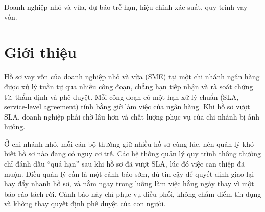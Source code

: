 \documentclass[journal]{IEEEtran}
\begin{document}
\begin{abstract}
Hồ sơ vay của doanh nghiệp nhỏ và vừa đi qua nhiều công đoạn, mỗi công đoạn có một hạn xử lý chuẩn tính bằng giờ làm việc. Các hệ thống thông thường chỉ báo hồ sơ quá hạn sau khi đã trễ. Bài báo trình bày hệ thống quản lý quy trình vay tích hợp bộ dự báo nguy cơ trễ dưới dạng một dịch vụ riêng. Hai mô hình, mỗi công đoạn một mô hình, ước lượng xác suất hồ sơ đang mở sẽ vượt hạn xử lý. Hạn xử lý là đầu vào của mô hình nên đổi định mức không cần huấn luyện lại; xác suất được hiệu chỉnh bằng hồi quy đẳng điệu và mỗi cảnh báo kèm tối đa ba lý do. Mô hình huấn luyện trên 20\,000 hồ sơ mô phỏng theo một nhật ký xử lý hồ sơ vay công khai. Trên tập kiểm tra, diện tích dưới đường cong đặc trưng hoạt động của bộ thu nhận đạt 0,824 ở tiếp nhận (trung bình năm lần chia dữ liệu là 0,813) và 0,720 ở thẩm định, so với 0,797 và 0,687 của đường cơ sở chỉ biết đồng hồ hạn xử lý. Mức cải thiện có ý nghĩa thống kê ở thẩm định nhưng chưa đủ bằng chứng ở tiếp nhận, nơi chỉ có 38 hồ sơ trễ. Mô hình huấn luyện ở một hạn cố định mất độ chính xác xác suất khi đổi hạn, còn mô hình nhận hạn làm đầu vào thì không. Chạy lại thực nghiệm trên một môi trường khác cho kết quả trùng khớp. Do dữ liệu mô phỏng, kết quả chỉ phản ánh phương pháp.
\end{abstract}

\begin{IEEEkeywords}
Doanh nghiệp nhỏ và vừa, dự báo trễ hạn, hiệu chỉnh xác suất, quy trình vay vốn.
\end{IEEEkeywords}

\section{Giới thiệu}
Hồ sơ vay vốn của doanh nghiệp nhỏ và vừa (SME) tại một chi nhánh ngân hàng được xử lý tuần tự qua nhiều công đoạn, chẳng hạn tiếp nhận và rà soát chứng từ, thẩm định và phê duyệt. Mỗi công đoạn có một hạn xử lý chuẩn (SLA, service-level agreement) tính bằng giờ làm việc của ngân hàng. Khi hồ sơ vượt SLA, doanh nghiệp phải chờ lâu hơn và chất lượng phục vụ của chi nhánh bị ảnh hưởng.

Ở chi nhánh nhỏ, mỗi cán bộ thường giữ nhiều hồ sơ cùng lúc, nên quản lý khó biết hồ sơ nào đang có nguy cơ trễ. Các hệ thống quản lý quy trình thông thường chỉ đánh dấu ``quá hạn'' sau khi hồ sơ đã vượt SLA, lúc đó việc can thiệp đã muộn. Điều quản lý cần là một cảnh báo sớm, đủ tin cậy để quyết định giao lại hay đẩy nhanh hồ sơ, và nằm ngay trong luồng làm việc hằng ngày thay vì một báo cáo tách rời. Cảnh báo này chỉ phục vụ điều phối, không chấm điểm tín dụng và không thay quyết định phê duyệt của con người.
\end{document}
